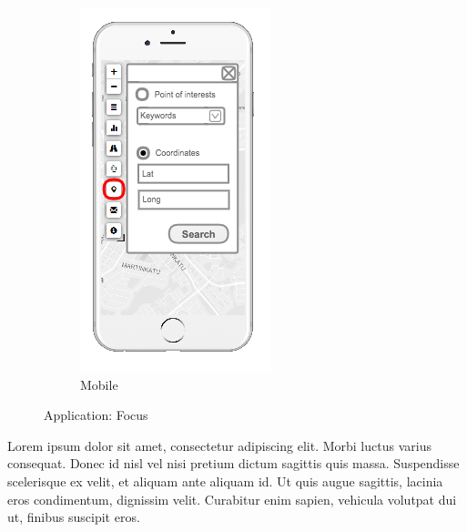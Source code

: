 \begin{figure}[ht]
\begin{subfigure}[b]{0.2\textwidth}
        \includegraphics[width=\textwidth]
          {img/c02-application/png/mobile-basemap-focus.png}
        \caption{Mobile}
    \end{subfigure}
    \caption{Application: Focus}
\end{figure}

Lorem ipsum dolor sit amet, consectetur adipiscing elit. Morbi luctus varius consequat. Donec id nisl vel nisi pretium dictum sagittis quis massa. Suspendisse scelerisque ex velit, et aliquam ante aliquam id. Ut quis augue sagittis, lacinia eros condimentum, dignissim velit. Curabitur enim sapien, vehicula volutpat dui ut, finibus suscipit eros. 

